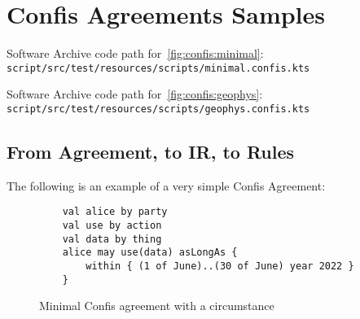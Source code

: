 \section{Confis Agreements Samples}\label{sec:confis-agreements-samples}

Software Archive code path for~\autoref{fig:confis:minimal}:\\
\texttt{script/src/test/resources/scripts/minimal.confis.kts}


Software Archive code path for~\autoref{fig:confis:geophys}:\\
\texttt{script/src/test/resources/scripts/geophys.confis.kts}


\subsection*{From Agreement, to IR, to Rules}

The following is an example of a very simple Confis Agreement:

\begin{figure}[h]
    \begin{verbatim}
    val alice by party
    val use by action
    val data by thing
    alice may use(data) asLongAs {
        within { (1 of June)..(30 of June) year 2022 }
    }
    \end{verbatim}
    \caption{Minimal Confis agreement with a circumstance}
    \label{fig:confis:min-circumstance}
\end{figure}

